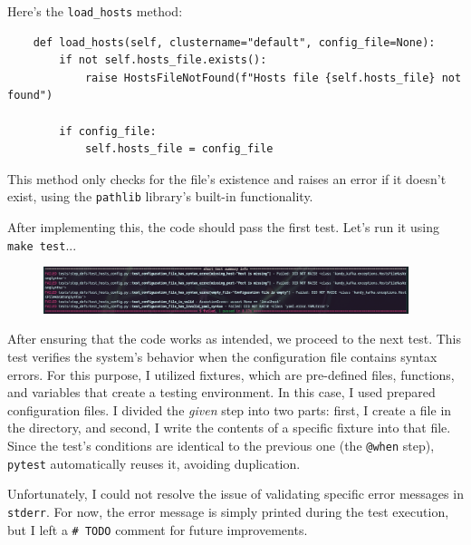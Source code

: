\documentclass[10pt , a4paper]{report}
\newenvironment{code}{\captionsetup{type=listing}}{}
\begin{document}
Here’s the \texttt{load\_hosts} method:

\begin{code}
  \begin{verbatim}
    def load_hosts(self, clustername="default", config_file=None):
        if not self.hosts_file.exists():
            raise HostsFileNotFound(f"Hosts file {self.hosts_file} not found")

        if config_file:
            self.hosts_file = config_file
  \end{verbatim}
\end{code}

This method only checks for the file's existence and raises an error if it doesn’t exist, using the \texttt{pathlib} library's built-in functionality.

After implementing this, the code should pass the first test. Let’s run it using \texttt{make test}...

\begin{figure}[!htbp]
  \begin{center}
    \includegraphics[width=0.95\textwidth]{imgs/BehaviourTestPassed.png}
  \end{center}
  \caption{}\label{fig:}
\end{figure}

After ensuring that the code works as intended, we proceed to the next test. This test verifies the system's behavior when the configuration file contains syntax errors. For this purpose, I utilized fixtures, which are pre-defined files, functions, and variables that create a testing environment. In this case, I used prepared configuration files. I divided the \textit{given} step into two parts: first, I create a file in the directory, and second, I write the contents of a specific fixture into that file. Since the test’s conditions are identical to the previous one (the \texttt{@when} step), \texttt{pytest} automatically reuses it, avoiding duplication.

Unfortunately, I could not resolve the issue of validating specific error messages in \texttt{stderr}. For now, the error message is simply printed during the test execution, but I left a \texttt{\# TODO} comment for future improvements.
\end{document}
